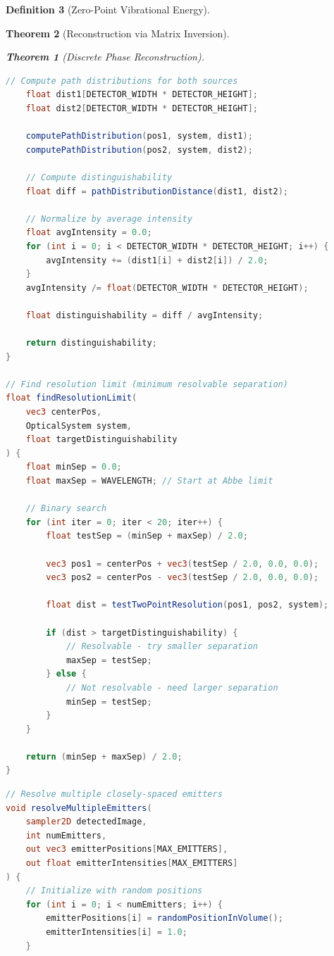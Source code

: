\documentclass[11pt,a4paper]{article}
\newtheorem{theorem}{Theorem}[section]
\theoremstyle{definition}
\newtheorem{definition}[theorem]{Definition}
\theoremstyle{remark}
\begin{document}
\begin{definition}[Zero-Point Vibrational Energy]
\begin{theorem}[Reconstruction via Matrix Inversion]
\begin{theorem}[Discrete Phase Reconstruction]
\begin{lstlisting}[language=GLSL,caption={Two-Point Resolution Test}]
    // Compute path distributions for both sources
    float dist1[DETECTOR_WIDTH * DETECTOR_HEIGHT];
    float dist2[DETECTOR_WIDTH * DETECTOR_HEIGHT];
    
    computePathDistribution(pos1, system, dist1);
    computePathDistribution(pos2, system, dist2);
    
    // Compute distinguishability
    float diff = pathDistributionDistance(dist1, dist2);
    
    // Normalize by average intensity
    float avgIntensity = 0.0;
    for (int i = 0; i < DETECTOR_WIDTH * DETECTOR_HEIGHT; i++) {
        avgIntensity += (dist1[i] + dist2[i]) / 2.0;
    }
    avgIntensity /= float(DETECTOR_WIDTH * DETECTOR_HEIGHT);
    
    float distinguishability = diff / avgIntensity;
    
    return distinguishability;
}

// Find resolution limit (minimum resolvable separation)
float findResolutionLimit(
    vec3 centerPos,
    OpticalSystem system,
    float targetDistinguishability
) {
    float minSep = 0.0;
    float maxSep = WAVELENGTH; // Start at Abbe limit
    
    // Binary search
    for (int iter = 0; iter < 20; iter++) {
        float testSep = (minSep + maxSep) / 2.0;
        
        vec3 pos1 = centerPos + vec3(testSep / 2.0, 0.0, 0.0);
        vec3 pos2 = centerPos - vec3(testSep / 2.0, 0.0, 0.0);
        
        float dist = testTwoPointResolution(pos1, pos2, system);
        
        if (dist > targetDistinguishability) {
            // Resolvable - try smaller separation
            maxSep = testSep;
        } else {
            // Not resolvable - need larger separation
            minSep = testSep;
        }
    }
    
    return (minSep + maxSep) / 2.0;
}
\end{lstlisting}

\begin{lstlisting}[language=GLSL,caption={Multi-Emitter Super-Resolution}]
// Resolve multiple closely-spaced emitters
void resolveMultipleEmitters(
    sampler2D detectedImage,
    int numEmitters,
    out vec3 emitterPositions[MAX_EMITTERS],
    out float emitterIntensities[MAX_EMITTERS]
) {
    // Initialize with random positions
    for (int i = 0; i < numEmitters; i++) {
        emitterPositions[i] = randomPositionInVolume();
        emitterIntensities[i] = 1.0;
    }
    

\end{lstlisting}
\end{theorem}
\end{theorem}
\end{definition}
\end{document}

